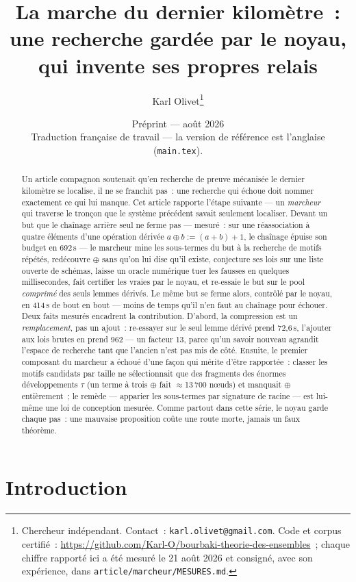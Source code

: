 \documentclass[11pt]{article}
\title{La marche du dernier kilomètre~:\\
une recherche gardée par le noyau, qui invente ses propres relais}
\author{Karl Olivet\thanks{Chercheur indépendant. Contact~:
\texttt{karl.olivet@gmail.com}. Code et corpus certifié~:
\url{https://github.com/Karl-O/bourbaki-theorie-des-ensembles}~; chaque
chiffre rapporté ici a été mesuré le 21 août 2026 et consigné, avec son
expérience, dans \texttt{article/marcheur/MESURES.md}.}}
\date{Préprint --- août 2026\\
{\small Traduction française de travail --- la version de référence est l'anglaise (\texttt{main.tex}).}}
\theoremstyle{remark}\newtheorem{remarque}{Remarque}
\begin{document}
\maketitle

\begin{abstract}
Un article compagnon soutenait qu'en recherche de preuve mécanisée le dernier
kilomètre se localise, il ne se franchit pas~: une recherche qui échoue doit
nommer exactement ce qui lui manque. Cet article rapporte l'étape suivante ---
un \emph{marcheur} qui traverse le tronçon que le système précédent savait
seulement localiser. Devant un but que le chaînage arrière seul ne ferme pas
--- mesuré~: sur une réassociation à quatre éléments d'une opération dérivée
$a \oplus b := (a+b)+1$, le chaînage épuise son budget en 692\,s --- le
marcheur mine les sous-termes du but à la recherche de motifs répétés,
redécouvre $\oplus$ sans qu'on lui dise qu'il existe, conjecture ses lois sur
une liste ouverte de schémas, laisse un oracle numérique tuer les fausses en
quelques millisecondes, fait certifier les vraies par le noyau, et re-essaie
le but sur le pool \emph{comprimé} des seuls lemmes dérivés. Le même but se
ferme alors, contrôlé par le noyau, en 414\,s de bout en bout --- moins de
temps qu'il n'en faut au chaînage pour échouer. Deux faits mesurés encadrent
la contribution. D'abord, la compression est un \emph{remplacement}, pas un
ajout~: re-essayer sur le seul lemme dérivé prend 72,6\,s, l'ajouter aux lois
brutes en prend 962 --- un facteur 13, parce qu'un savoir nouveau agrandit
l'espace de recherche tant que l'ancien n'est pas mis de côté. Ensuite, le
premier composant du marcheur a échoué d'une façon qui mérite d'être
rapportée~: classer les motifs candidats par taille ne sélectionnait que des
fragments des énormes développements $\tau$ (un terme à trois $\oplus$ fait
$\approx$13\,700 nœuds) et manquait $\oplus$ entièrement~; le remède ---
apparier les sous-termes par signature de racine --- est lui-même une loi de
conception mesurée. Comme partout dans cette série, le noyau garde chaque
pas~: une mauvaise proposition coûte une route morte, jamais un faux
théorème.
\end{abstract}

\section{Introduction}
\label{sec:intro}
\end{document}
